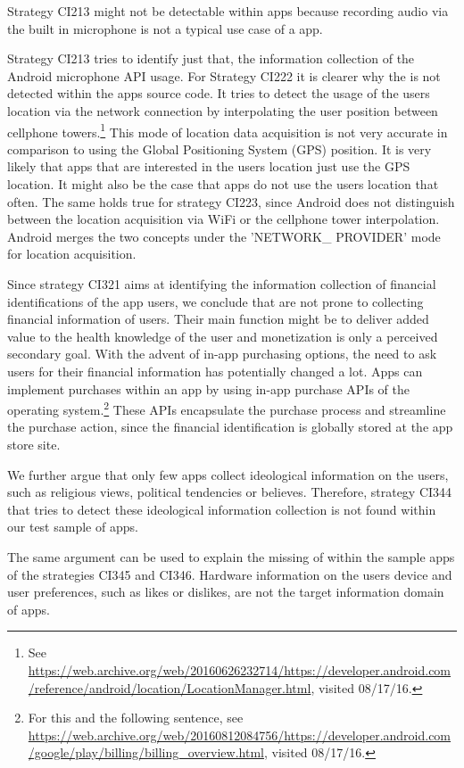 Strategy CI213 might not be detectable within \mH apps because recording audio via the built in microphone is not a typical use case of a \mH app.

Strategy CI213 tries to identify just that, the information collection of the Android microphone API usage.
For Strategy CI222 it is clearer why the \ipr is not detected within the apps source code.
It tries to detect the usage of the users location via the network connection by interpolating the user position between cellphone towers.\footnote{\raggedright See \url{https://web.archive.org/web/20160626232714/https://developer.android.com/reference/android/location/LocationManager.html}, visited 08/17/16.}
This mode of location data acquisition is not very accurate in comparison to using the Global Positioning System (GPS) position.
It is very likely that apps that are interested in the users location just use the GPS location. 
It might also be the case that \mH apps do not use the users location that often.
The same holds true for strategy CI223, since Android does not distinguish between the location acquisition via WiFi or the cellphone tower interpolation.
Android merges the two concepts under the 'NETWORK\_ PROVIDER' mode for location acquisition.

Since strategy CI321 aims at identifying the information collection of financial identifications of the app users, we conclude that \mH are not prone to collecting financial information of users.
Their main function might be to deliver added value to the health knowledge of the user and monetization is only a perceived secondary goal.
With the advent of in-app purchasing options, the need to ask users for their financial information has potentially changed a lot.
Apps can implement purchases within an app by using in-app purchase APIs of the operating system.\footnote{\raggedright For this and the following sentence, see \url{https://web.archive.org/web/20160812084756/https://developer.android.com/google/play/billing/billing_overview.html}, visited 08/17/16.}
These APIs encapsulate the purchase process and streamline the purchase action, since the financial identification is globally stored at the app store site.

We further argue that only few \mH apps collect ideological information on the users, such as religious views, political tendencies or believes. 
Therefore, strategy CI344 that tries to detect these ideological information collection is not found within our test sample of \mH apps.

The same argument can be used to explain the missing of \ipr within the sample apps of the strategies CI345 and CI346.
Hardware information on the users device and user preferences, such as likes or dislikes, are not the target information domain of \mH apps.

